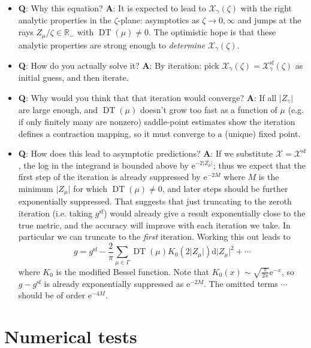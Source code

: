 \documentclass[12pt,letterpaper,reqno]{article}
\numberwithin{equation}{section}
\newcommand{\cX}{\ensuremath{\mathcal X}}
\newcommand{\bbR}{\ensuremath{\mathbb R}}
\newcommand{\e}{{\mathrm e}}
\newcommand{\de}{\mathrm{d}}
\renewcommand{\sf}{\mathrm{sf}}
\newcommand{\abs}[1]{\lvert#1\rvert}
\newcommand{\ti}[1]{\textit{#1}}
\DeclareMathOperator{\DT}{DT}
\begin{document}
\begin{itemize}
  \item {\bf Q}: Why this equation? {\bf A}: It is expected to lead to $\cX_\gamma(\zeta)$ with
  the right analytic properties in the $\zeta$-plane: asymptotics as $\zeta \to 0,\infty$
  and jumps at the rays $Z_\mu / \zeta \in \bbR_-$ with $\DT(\mu) \neq 0$.
  The optimistic hope is that these analytic properties are strong enough
  to \ti{determine} $\cX_\gamma(\zeta)$.

  \item {\bf Q}: How do you actually solve it? {\bf A}: By iteration: pick
  $\cX_\gamma(\zeta) = \cX_\gamma^\sf(\zeta)$ as initial guess, 
  and then iterate.

  \item {\bf Q}: Why would you think that that iteration would converge?
  {\bf A}: If all $\abs{Z_\gamma}$ are large enough, and $\DT(\mu)$ doesn't grow too fast
  as a function of $\mu$ (e.g. if only finitely many are nonzero)
  saddle-point estimates show 
  the iteration defines a contraction mapping, so it must
  converge to a (unique) fixed point.

  \item {\bf Q}: How does this lead to asymptotic predictions? {\bf A}: 
  If we substitute $\cX = \cX^\sf$, the log in the
  integrand is bounded above by $\e^{-2 \abs{Z_\mu}}$;
  thus we expect that the first step of the iteration is already
  suppressed by $\e^{-2 M}$ where $M$ is the minimum $\abs{Z_\mu}$
  for which $\DT(\mu) \neq 0$, and later steps
  should be further exponentially suppressed. That suggests
  that just truncating to the zeroth iteration (i.e. taking $g^\sf$)
  would already give a result exponentially close to the true metric,
  and the accuracy will improve with each iteration we take.
  In particular we can truncate to the \ti{first} iteration.
  Working this out leads to
  \begin{equation}
    g = g^\sf - \frac{2}{\pi} \sum_{\mu \in \Gamma} \DT(\mu) K_0\left( 2 \abs{Z_\mu} \right) \de \abs{Z_\mu}^2 + \cdots
  \end{equation}
  where $K_0$ is the modified Bessel function.
  Note that $K_0(x) \sim \sqrt{\frac{\pi}{2x}} \e^{-x}$,
  so $g - g^\sf$ is already exponentially suppressed as $\e^{-2M}$.
  The omitted terms $\cdots$ should be of order $\e^{-4M}$.
\end{itemize}


\section{Numerical tests}
\end{document}
